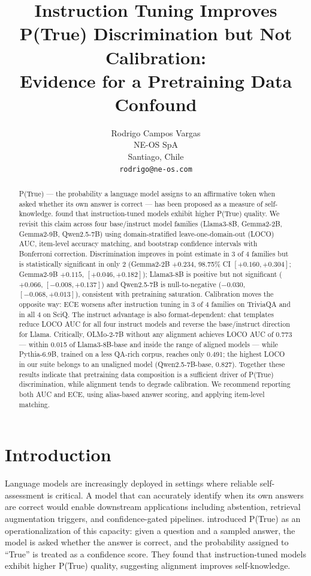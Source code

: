 \documentclass[11pt]{article}
\title{Instruction Tuning Improves P(True) Discrimination but Not Calibration:\\
Evidence for a Pretraining Data Confound}
\author{Rodrigo Campos Vargas \\
  NE-OS SpA \\
  Santiago, Chile \\
  \texttt{rodrigo@ne-os.com}}
\begin{document}
\maketitle

\begin{abstract}
P(True) --- the probability a language model assigns to an affirmative token when asked whether its own answer is correct --- has been proposed as a measure of self-knowledge. \citet{kadavath2022} found that instruction-tuned models exhibit higher P(True) quality. We revisit this claim across four base/instruct model families (Llama3-8B, Gemma2-2B, Gemma2-9B, Qwen2.5-7B) using domain-stratified leave-one-domain-out (LOCO) AUC, item-level accuracy matching, and bootstrap confidence intervals with Bonferroni correction. Discrimination improves in point estimate in 3 of 4 families but is statistically significant in only 2 (Gemma2-2B $+0.234$, 98.75\% CI $[+0.160, +0.304]$; Gemma2-9B $+0.115$, $[+0.046, +0.182]$); Llama3-8B is positive but not significant ($+0.066$, $[-0.008, +0.137]$) and Qwen2.5-7B is null-to-negative ($-0.030$, $[-0.068, +0.013]$), consistent with pretraining saturation. Calibration moves the opposite way: ECE worsens after instruction tuning in 3 of 4 families on TriviaQA and in all 4 on SciQ. The instruct advantage is also format-dependent: chat templates reduce LOCO AUC for all four instruct models and reverse the base/instruct direction for Llama. Critically, OLMo-2-7B without any alignment achieves LOCO AUC of 0.773 --- within 0.015 of Llama3-8B-base and inside the range of aligned models --- while Pythia-6.9B, trained on a less QA-rich corpus, reaches only 0.491; the highest LOCO in our suite belongs to an unaligned model (Qwen2.5-7B-base, 0.827). Together these results indicate that pretraining data composition is a sufficient driver of P(True) discrimination, while alignment tends to degrade calibration. We recommend reporting both AUC and ECE, using alias-based answer scoring, and applying item-level matching.
\end{abstract}

\section{Introduction}

Language models are increasingly deployed in settings where reliable self-assessment is critical. A model that can accurately identify when its own answers are correct would enable downstream applications including abstention, retrieval augmentation triggers, and confidence-gated pipelines. \citet{kadavath2022} introduced P(True) as an operationalization of this capacity: given a question and a sampled answer, the model is asked whether the answer is correct, and the probability assigned to ``True'' is treated as a confidence score. They found that instruction-tuned models exhibit higher P(True) quality, suggesting alignment improves self-knowledge.
\end{document}
